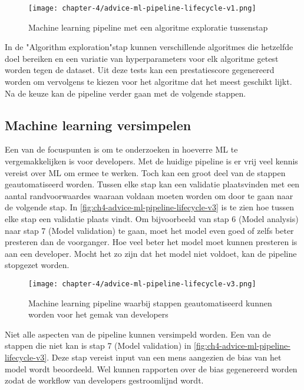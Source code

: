 \begin{figure}[hbt!]
  \centering
  \texttt{[image: chapter-4/advice-ml-pipeline-lifecycle-v1.png]}
  \caption{Machine learning pipeline met een algoritme exploratie tussenstap}
  \label{fig:ch4-advice-ml-pipeline-lifecycle-v1}
\end{figure}

In de "Algorithm exploration"\space stap kunnen verschillende algoritmes die hetzelfde doel bereiken en een variatie van hyperparameters voor elk algoritme getest worden tegen de dataset. Uit deze tests kan een prestatiescore gegenereerd worden om vervolgens te kiezen voor het algoritme dat het meest geschikt lijkt. Na de keuze kan de pipeline verder gaan met de volgende stappen.

\subsection{Machine learning versimpelen}\label{subsec:ch4-machine-learning-versimpelen}
Een van de focuspunten is om te onderzoeken in hoeverre ML te vergemakkelijken is voor developers. Met de huidige pipeline is er vrij veel kennis vereist over ML om ermee te werken. Toch kan een groot deel van de stappen geautomatiseerd worden. Tussen elke stap kan een validatie plaatsvinden met een aantal randvoorwaardes waaraan voldaan moeten worden om door te gaan naar de volgende stap. In \autoref{fig:ch4-advice-ml-pipeline-lifecycle-v3} is te zien hoe tussen elke stap een validatie plaats vindt. Om bijvoorbeeld van stap 6 (Model analysis) naar stap 7 (Model validation) te gaan, moet het model even goed of zelfs beter presteren dan de voorganger. Hoe veel beter het model moet kunnen presteren is aan een developer. Mocht het zo zijn dat het model niet voldoet, kan de pipeline stopgezet worden.

\begin{figure}[hbt!]
  \centering
  \texttt{[image: chapter-4/advice-ml-pipeline-lifecycle-v3.png]}
  \caption{Machine learning pipeline waarbij stappen geautomatiseerd kunnen worden voor het gemak van developers}
  \label{fig:ch4-advice-ml-pipeline-lifecycle-v3}
\end{figure}

Niet alle aspecten van de pipeline kunnen versimpeld worden. Een van de stappen die niet kan is stap 7 (Model validation) in \autoref{fig:ch4-advice-ml-pipeline-lifecycle-v3}. Deze stap vereist input van een mens aangezien de bias van het model wordt beoordeeld. Wel kunnen rapporten over de bias gegenereerd worden zodat de workflow van developers gestroomlijnd wordt.